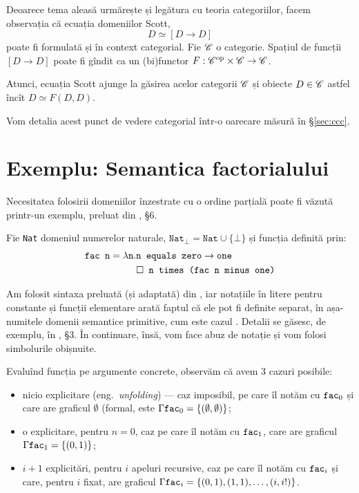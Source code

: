 \begin{remark}\label{rk:dom-cat}
  Deoarece tema aleasă urmărește și legătura cu teoria categoriilor, facem
  observația că ecuația domeniilor Scott,
  \[
    D \simeq [D \to D]
  \]
  poate fi formulată și în context categorial. Fie $ \mathscr{C} $ o categorie.
  Spațiul de funcții $ [D \to D] $ poate fi gîndit ca un (bi)functor
  $ F : \mathscr{C}^{\text{op}} \times \mathscr{C} \to \mathscr{C} $.

  Atunci, ecuația Scott ajunge la găsirea acelor categorii $ \mathscr{C} $ și obiecte
  $ D \in \mathscr{C} $ astfel încît $ D \simeq F(D, D) $.

  Vom detalia acest punct de vedere categorial într-o oarecare măsură în
  \S\ref{sec:ccc}.
\end{remark}


\section{Exemplu: Semantica factorialului}

\indent\indent Necesitatea folosirii domeniilor înzestrate cu o ordine parțială
poate fi văzută printr-un exemplu, preluat din \cite{schm}, \S 6.

Fie \texttt{Nat} domeniul numerelor naturale,
$\texttt{Nat}_\perp = \texttt{Nat} \cup \{ \bot \} $ și funcția definită prin:
\begin{align*}
  \texttt{fac n} = \lambda \texttt{n}.&\texttt{n equals zero} \to \texttt{one} \\
               &\square \texttt{ n times (fac n minus one)}
\end{align*}

Am folosit sintaxa preluată (și adaptată) din \cite{schm}, iar notațiile
în litere pentru constante și funcții elementare arată faptul că ele pot fi
definite separat, în așa-numitele domenii semantice primitive, cum este cazul
. Detalii se găsesc, de exemplu, în \cite{schm}, \S 3. În continuare,
însă, vom face abuz de notație și vom folosi simbolurile obișnuite.

Evaluînd funcția  pe argumente concrete, observăm că avem 3 cazuri posibile:
\begin{itemize}
\item nicio explicitare (eng.\ \emph{unfolding}) --- caz imposibil, pe care îl notăm
  cu $ \texttt{fac}_0 $ și care are graficul $ \emptyset $ (formal, este
  $ \Gamma \texttt{fac}_0 = \{ (\emptyset, \emptyset) \} $;
\item o explicitare, pentru $ n = 0 $, caz pe care îl notăm cu $ \texttt{fac}_1 $, care are
  graficul $ \Gamma \texttt{fac}_1 = \{ (0, 1) \} $;
\item $ i + 1 $ explicitări, pentru $ i $ apeluri recursive, caz pe care îl notăm cu
  $ \texttt{fac}_i $ și care, pentru $ i $ fixat, are graficul
  $ \Gamma \texttt{fac}_i = \{ (0, 1), (1, 1), \dots, (i, i!) \} $.
\end{itemize}

